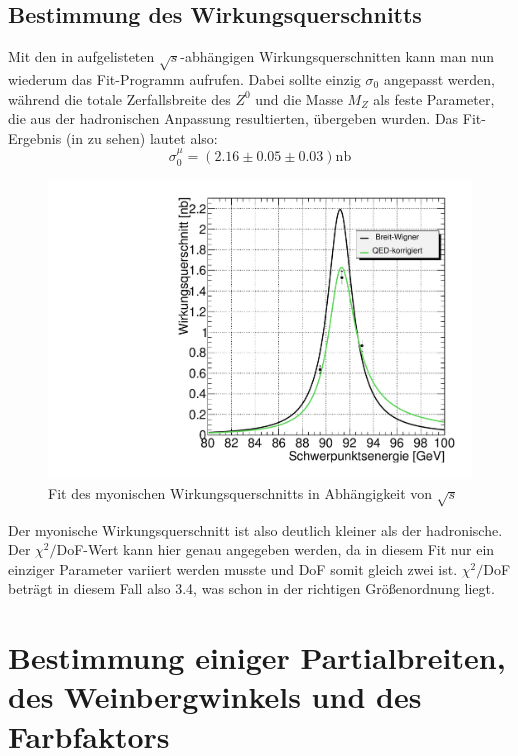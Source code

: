 \subsection{Bestimmung des Wirkungsquerschnitts}
Mit den in  aufgelisteten $\sqrt{s}$-abhängigen Wirkungsquerschnitten kann man nun wiederum das Fit-Programm aufrufen. Dabei sollte einzig $\sigma_0$ angepasst werden, während die totale Zerfallsbreite des $Z^0$ und die Masse $M_Z$ als feste Parameter, die aus der hadronischen Anpassung resultierten, übergeben wurden. Das Fit-Ergebnis (in  zu sehen) lautet also:
\begin{equation*}
\sigma_0^{\mu} = (2.16 \pm 0.05 \pm 0.03)\si{\nano\barn}
\end{equation*}
\begin{figure}[htb]
	\centering
	\includegraphics[width=1\columnwidth,keepaspectratio]{fit_muon}
	\caption{Fit des myonischen Wirkungsquerschnitts in Abhängigkeit von $\sqrt{s}$}
	\label{fig:muonfit}
\end{figure}
Der myonische Wirkungsquerschnitt ist also deutlich kleiner als der hadronische.\\
Der $\chi^2/$DoF-Wert kann hier genau angegeben werden, da in diesem Fit nur ein einziger Parameter variiert werden musste und DoF somit gleich zwei ist. $\chi^2/$DoF beträgt in diesem Fall also 3.4, was schon in der richtigen Größenordnung liegt.

\section{Bestimmung einiger Partialbreiten, des Weinbergwinkels und des Farbfaktors}
